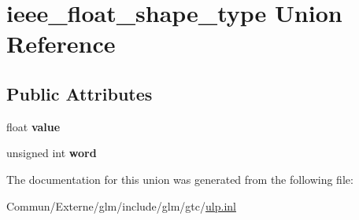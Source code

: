 \hypertarget{unionieee__float__shape__type}{}\section{ieee\+\_\+float\+\_\+shape\+\_\+type Union Reference}
\label{unionieee__float__shape__type}
\subsection*{Public Attributes}
\begin{DoxyCompactItemize}
\item 
float {\bfseries value}\hypertarget{unionieee__float__shape__type_aa0c47451f1b974421cbb9e2833ddb68e}{}\label{unionieee__float__shape__type_aa0c47451f1b974421cbb9e2833ddb68e}

\item 
unsigned int {\bfseries word}\hypertarget{unionieee__float__shape__type_a49230c21acd672d044f38b1abcbd6071}{}\label{unionieee__float__shape__type_a49230c21acd672d044f38b1abcbd6071}

\end{DoxyCompactItemize}


The documentation for this union was generated from the following file\+:\begin{DoxyCompactItemize}
\item 
Commun/\+Externe/glm/include/glm/gtc/\hyperlink{ulp_8inl}{ulp.\+inl}\end{DoxyCompactItemize}
